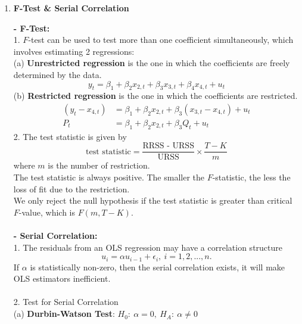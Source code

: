 \documentclass{article}
\begin{document}
\begin{enumerate}[S1 - ]
    \item \textbf{F-Test \& Serial Correlation}\\\par
    \textbf{- F-Test:}\\
    1. $F$-test can be used to test more than one coefficient simultaneously, which involves estimating 2 regressions:\\
    (a) \textbf{Unrestricted regression} is the one in which the coefficients are freely determined by the data.
    \begin{equation*}
    y_t = \beta_1 + \beta_2x_{2,t} + \beta_3x_{3,t} + \beta_4x_{4,t} + u_t
    \end{equation*}
    (b) \textbf{Restricted regression} is the one in which the coefficients are restricted.
    \begin{equation*}
    \begin{split}
    (y_t-x_{4,t}) & = \beta_1 + \beta_2x_{2,t} + \beta_3(x_{3,t}-x_{4,t}) + u_t\\
    P_t & = \beta_1 + \beta_2x_{2,t} + \beta_3Q_t +u_t
    \end{split}
    \end{equation*}
    2. The test statistic is given by
    \begin{equation*}
    \text{test statistic} = \frac{\text{RRSS - URSS}}{\text{URSS}} \times \frac{T-K}{m}
    \end{equation*}
    where $m$ is the number of restriction.\\
    The test statistic is always positive. The smaller the $F$-statistic, the less the loss of fit due to the restriction.\\
    We only reject the null hypothesis if the test statistic is greater than critical $F$-value, which is $F(m,T-K)$.\\
    \\
    \textbf{- Serial Correlation:}\\
    1. The residuals from an OLS regression may have a correlation structure
    \begin{equation*}
    u_i = \alpha u_{i-1} + \epsilon_i, \ i = 1,2,...,n.
    \end{equation*}
    If $\alpha$ is statistically non-zero, then the serial correlation exists, it will make OLS estimators inefficient.\\
    \\
    2. Test for Serial Correlation\\
    (a) \textbf{Durbin-Watson Test}: $H_0:\ \alpha=0, \ H_A:\ \alpha \neq 0$\\

\end{enumerate}
\end{document}
